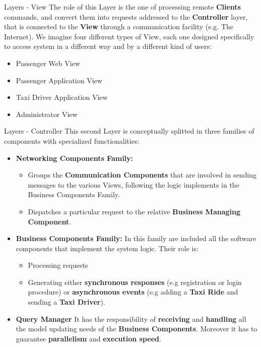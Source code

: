 \documentclass{../common/latex_classes/pdf_presentation}
\begin{document}
	\begin{frame}{Layers - View}
		The role of this Layer is the one of processing remote \textbf{Clients} commands, and convert them into requests addressed to the \textbf{Controller} layer, that is connected to the \textbf{View} through a communication facility (e.g. The Internet).
		We imagine four different types of View, each one designed specifically to access \myTaxiService{} system in a different way and by a different kind of users:
		\begin{itemize}
			\item Passenger Web View
			\item Passenger Application View
			\item Taxi Driver Application View
			\item Administrator View
		\end{itemize}
	\end{frame}
	
	\begin{frame}{Layers - Controller}
		This second Layer is conceptually splitted in three families of components with specialized functionalities:
		\begin{itemize}
			\item \textbf{Networking Components Family:}
			\begin{itemize}
				\item Groups the \textbf{Communication Components} that are involved in sending messages to the various Views, following the logic implements in the Business Components Family. 
				\item Dispatches a particular request to the relative \textbf{Business Managing Component}.
			\end{itemize}
			\item \textbf{Business Components Family:} In this family are included all the software components that implement the system logic.
			Their role is:
			\begin{itemize}
				\item Processing requests 
				\item Generating either \textbf{synchronous responses} (e.g registration or login procedure) or \textbf{asynchronous events} (e.g adding a \textbf{Taxi Ride} and sending a \textbf{Taxi Driver}).
			\end{itemize}
			\item \textbf{Query Manager} It has the responsibility of \textbf{receiving} and \textbf{handling} all the model updating needs of the \textbf{Business Components}. Moreover it has to guarantee \textbf{parallelism} and \textbf{execution speed}.
		\end{itemize}
	\end{frame}
	
\end{document}
